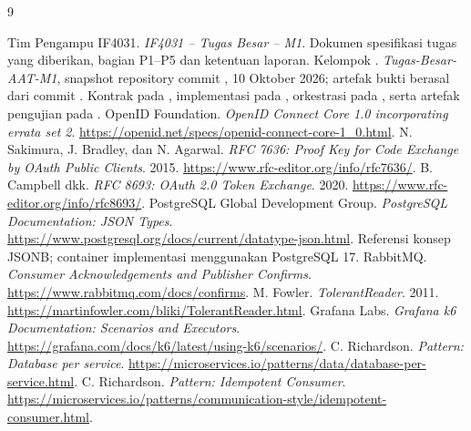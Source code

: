 \begin{thebibliography}{9}
 Tim Pengampu IF4031. \emph{IF4031 -- Tugas Besar -- M1}. Dokumen spesifikasi tugas yang diberikan, bagian P1--P5 dan ketentuan laporan.
 Kelompok \NamaKelompok. \emph{Tugas-Besar-AAT-M1}, snapshot repository commit , 10 Oktober 2026; artefak bukti berasal dari commit . Kontrak pada , implementasi pada , orkestrasi pada , serta artefak pengujian pada .
 OpenID Foundation. \emph{OpenID Connect Core 1.0 incorporating errata set 2}. \url{https://openid.net/specs/openid-connect-core-1_0.html}.
 N. Sakimura, J. Bradley, dan N. Agarwal. \emph{RFC 7636: Proof Key for Code Exchange by OAuth Public Clients}. 2015. \url{https://www.rfc-editor.org/info/rfc7636/}.
 B. Campbell dkk. \emph{RFC 8693: OAuth 2.0 Token Exchange}. 2020. \url{https://www.rfc-editor.org/info/rfc8693/}.
 PostgreSQL Global Development Group. \emph{PostgreSQL Documentation: JSON Types}. \url{https://www.postgresql.org/docs/current/datatype-json.html}. Referensi konsep JSONB; container implementasi menggunakan PostgreSQL 17.
 RabbitMQ. \emph{Consumer Acknowledgements and Publisher Confirms}. \url{https://www.rabbitmq.com/docs/confirms}.
 M. Fowler. \emph{TolerantReader}. 2011. \url{https://martinfowler.com/bliki/TolerantReader.html}.
 Grafana Labs. \emph{Grafana k6 Documentation: Scenarios and Executors}. \url{https://grafana.com/docs/k6/latest/using-k6/scenarios/}.
 C. Richardson. \emph{Pattern: Database per service}. \url{https://microservices.io/patterns/data/database-per-service.html}.
 C. Richardson. \emph{Pattern: Idempotent Consumer}. \url{https://microservices.io/patterns/communication-style/idempotent-consumer.html}.
\end{thebibliography}
